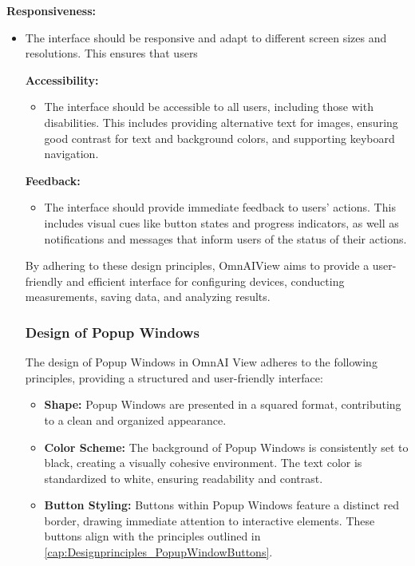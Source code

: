 \documentclass[]{scrreprt}
\begin{document}
\textbf{Responsiveness:}
\begin{itemize}
    \item The interface should be responsive and adapt to different screen sizes and resolutions. This ensures that users

\textbf{Accessibility:}
    \begin{itemize}
        \item The interface should be accessible to all users, including those with disabilities. This includes providing alternative text for images, ensuring good contrast for text and background colors, and supporting keyboard navigation.
    \end{itemize}
    
\textbf{Feedback:}
    \begin{itemize}
        \item The interface should provide immediate feedback to users' actions. This includes visual cues like button states and progress indicators, as well as notifications and messages that inform users of the status of their actions.
    \end{itemize}
    
By adhering to these design principles, OmnAIView aims to provide a user-friendly and efficient interface for configuring devices, conducting measurements, saving data, and analyzing results.
    
\subsubsection{Design of Popup Windows}

The design of Popup Windows in OmnAI View adheres to the following principles, providing a structured and user-friendly interface:

\begin{itemize}
    \item \textbf{Shape:} Popup Windows are presented in a squared format, contributing to a clean and organized appearance.
    
    \item \textbf{Color Scheme:} The background of Popup Windows is consistently set to black, creating a visually cohesive environment. The text color is standardized to white, ensuring readability and contrast.
    
    \item \textbf{Button Styling:} Buttons within Popup Windows feature a distinct red border, drawing immediate attention to interactive elements. These buttons align with the principles outlined in \ref{cap:Designprinciples_PopupWindowButtons}.
    

\end{itemize}
\end{itemize}
\end{document}
